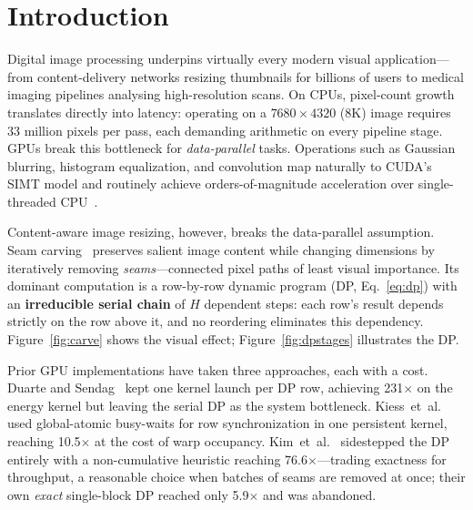 \section{Introduction}
Digital image processing underpins virtually every modern visual application---from
content-delivery networks resizing thumbnails for billions of users to medical
imaging pipelines analysing high-resolution scans. On CPUs, pixel-count growth
translates directly into latency: operating on a $7680{\times}4320$ (8K) image
requires 33 million pixels per pass, each demanding arithmetic on every pipeline
stage. GPUs break this bottleneck for \emph{data-parallel} tasks.
Operations such as Gaussian blurring, histogram equalization, and convolution
map naturally to CUDA's SIMT model and routinely achieve orders-of-magnitude
acceleration over single-threaded CPU~\cite{cudaguide}.

Content-aware image resizing, however, breaks the data-parallel assumption.
Seam carving~\cite{avidan2007} preserves salient image content while changing
dimensions by iteratively removing \emph{seams}---connected pixel paths of
least visual importance. Its dominant computation is a row-by-row dynamic
program (DP, Eq.~\eqref{eq:dp}) with an
\textbf{irreducible serial chain} of $H$ dependent steps: each row's result
depends strictly on the row above it, and no reordering eliminates this
dependency. Figure~\ref{fig:carve} shows the visual effect;
Figure~\ref{fig:dpstages} illustrates the DP.

Prior GPU implementations have taken three approaches, each with a cost.
Duarte and Sendag~\cite{duarte2012} kept one kernel launch per DP row,
achieving 231$\times$ on the energy kernel but leaving the serial DP as the
system bottleneck. Kiess~et~al.~\cite{kiess2014} used global-atomic
busy-waits for row synchronization in one persistent kernel, reaching
10.5$\times$ at the cost of warp occupancy.
Kim~et~al.~\cite{kim2015} sidestepped the DP entirely with a
non-cumulative heuristic reaching 76.6$\times$---trading exactness for
throughput, a reasonable choice when batches of seams are removed at once; their
own \emph{exact} single-block DP reached only 5.9$\times$ and was abandoned.

